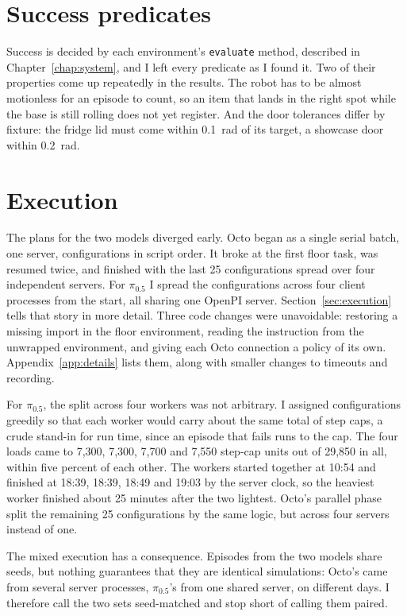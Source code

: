\section{Success predicates}

Success is decided by each environment's \texttt{evaluate} method, described in Chapter~\ref{chap:system}, and I left every predicate as I found it. Two of their properties come up repeatedly in the results. The robot has to be almost motionless for an episode to count, so an item that lands in the right spot while the base is still rolling does not yet register. And the door tolerances differ by fixture: the fridge lid must come within 0.1~rad of its target, a showcase door within 0.2~rad.

\section{Execution}
\label{sec:execution-plan}

The plans for the two models diverged early. Octo began as a single serial batch, one server, configurations in script order. It broke at the first floor task, was resumed twice, and finished with the last 25 configurations spread over four independent servers. For $\pi_{0.5}$ I spread the configurations across four client processes from the start, all sharing one OpenPI server. Section~\ref{sec:execution} tells that story in more detail. Three code changes were unavoidable: restoring a missing import in the floor environment, reading the instruction from the unwrapped environment, and giving each Octo connection a policy of its own. Appendix~\ref{app:details} lists them, along with smaller changes to timeouts and recording.

For $\pi_{0.5}$, the split across four workers was not arbitrary. I assigned configurations greedily so that each worker would carry about the same total of step caps, a crude stand-in for run time, since an episode that fails runs to the cap. The four loads came to 7,300, 7,300, 7,700 and 7,550 step-cap units out of 29,850 in all, within five percent of each other. The workers started together at 10:54 and finished at 18:39, 18:39, 18:49 and 19:03 by the server clock, so the heaviest worker finished about 25 minutes after the two lightest. Octo's parallel phase split the remaining 25 configurations by the same logic, but across four servers instead of one.

The mixed execution has a consequence. Episodes from the two models share seeds, but nothing guarantees that they are identical simulations: Octo's came from several server processes, $\pi_{0.5}$'s from one shared server, on different days. I therefore call the two sets seed-matched and stop short of calling them paired.


